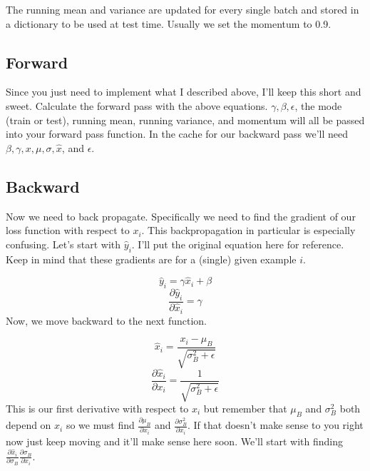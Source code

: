 \documentclass[12pt]{article}
\begin{document}
The running mean and variance are updated for every single batch and stored in a dictionary to 
be used at test time. Usually we set the momentum to 0.9.

\subsection{Forward}
Since you just need to implement what I described above, I'll keep this short and sweet. 
Calculate the forward pass with the above equations. $\gamma, \beta, \epsilon$, the mode 
(train or test), running mean, running variance, and momentum will all be passed into your 
forward pass function. In the cache for our backward pass we'll need $\beta, \gamma, x, \mu, 
\sigma, \hat{x}$, and $\epsilon$. 

\subsection{Backward}
Now we need to back propagate. Specifically we need to find the gradient of our loss function with 
respect to $x_i$. This backpropagation in particular is especially confusing. Let's start with 
$\hat{y}_i$. I'll put the original equation here for reference. Keep in mind that these gradients  
are for a (single) given example $i$. 

\begin{equation*}
    \hat{y}_i = \gamma \hat{x}_i + \beta
\end{equation*}
\begin{equation*}
    \frac{\partial \hat{y}_i}{\partial \hat{x}_i} = \gamma
\end{equation*}
Now, we move backward to the next function. 

\begin{equation*}
    \hat{x}_i = \frac{x_i - \mu_B}{\sqrt{\sigma_B^2 + \epsilon}}
\end{equation*}
\begin{equation*}
    \frac{\partial \hat{x}_i}{\partial x_i} = \frac{1}{\sqrt{\sigma_B^2 + \epsilon}}
\end{equation*}
This is our first derivative with respect to $x_i$ but remember that $\mu_B$ and 
$\sigma_B^2$ both depend on $x_i$ so we must find $\frac{\partial \mu_B}{\partial x_i}$ 
and $\frac{\partial \sigma_B^2}{\partial x_i}$. If that doesn't make sense 
to you right now just keep moving and it'll make sense here soon. We'll start with 
finding $\frac{\partial \hat{x}_i}{\partial \sigma_B} \frac{\partial \sigma_B}{\partial x_i}$. 
\end{document}
